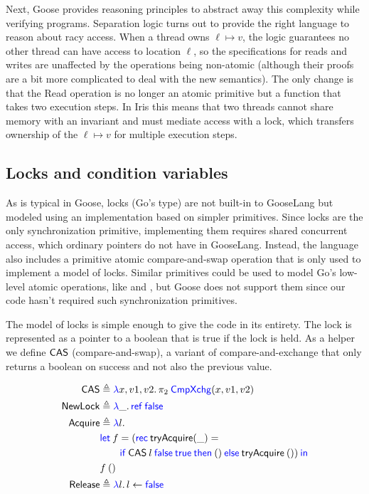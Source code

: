Next, Goose provides reasoning principles to abstract away this complexity while
verifying programs. Separation logic turns out to provide the right
language to reason about racy access. When a thread owns
$\ell \mapsto v$, the logic guarantees no other thread can have access to location
$\ell$, so the specifications for reads and writes are unaffected by the
operations being non-atomic (although their proofs are a bit more
complicated to deal with the new semantics). The only change is that the
Read operation is no longer an atomic primitive but a function that
takes two execution steps. In Iris this means that two threads cannot
share memory with an invariant and must mediate access with a lock,
which transfers ownership of the $\ell \mapsto v$ for multiple execution
steps.

\subsection{Locks and condition variables}%
\label{sec:goose:locks}

\newcommand{\Acquire}{\goosedef{Acquire}}
\newcommand{\CAS}{\goosedef{CAS}}

As is typical in Goose, locks (Go's  type) are not built-in to GooseLang but modeled
using an implementation based on simpler primitives. Since locks are the
only synchronization primitive, implementing them requires shared
concurrent access, which ordinary pointers do not have in GooseLang.
Instead, the language also includes a primitive atomic compare-and-swap
operation that is only used to implement a model of locks. Similar primitives
could be used to model Go's low-level atomic operations, like
 and , but Goose does not
support them since our code hasn't required such synchronization primitives.

The model of locks is simple enough to give the code in its entirety. The lock
is represented as a pointer to a boolean that is true if the lock is held. As a
helper we define $\CAS$ (compare-and-swap), a variant of compare-and-exchange
that only returns a boolean on success and not also the previous value.

\begin{align*}
  \CAS &\defeq \gooselambda{x, v1, v2} \pi_{2}\app \goosekw{CmpXchg}(x, v1, v2) \\
  \goosedef{NewLock} & \defeq \gooselambda{\_} \goosekw{ref} \app \goosekw{false} \\
  \Acquire &\defeq \gooselambda{l} \\
       &\goosekw{let}\app f = (\goosekw{rec}\: \textlog{tryAcquire}(\_) = \\
       &\qquad \gooseif{\CAS \app l \app \goosekw{false} \app \goosekw{true}}%
         {()}{\textlog{tryAcquire} \app ()}) \app\goosekw{in} \\
       &f \app () \\
  \goosedef{Release} &\defeq \gooselambda{l} l \gets \goosekw{false} \\
\end{align*}

